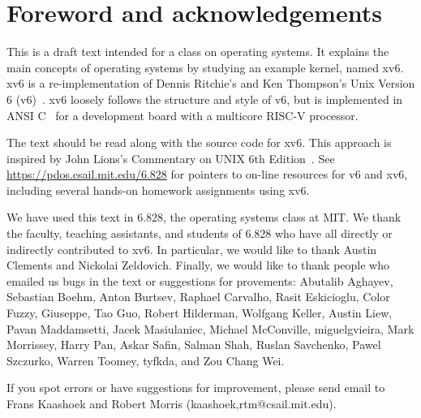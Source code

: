 \chapter*{Foreword and acknowledgements}


This is a draft text intended for a class on operating systems. It
explains the main concepts of operating systems by studying an example
kernel, named xv6.  xv6 is a re-implementation of Dennis Ritchie's and
Ken Thompson's Unix Version 6 (v6)~\cite{unix}.  xv6 loosely follows the structure
and style of v6, but is implemented in ANSI C~\cite{kernighan} for a development board
with a multicore RISC-V processor.

The text should be read along with the source code for xv6. This approach is
inspired by John Lions's Commentary on UNIX 6th Edition~\cite{lions}. See
\url{https://pdos.csail.mit.edu/6.828} for pointers to on-line
resources for v6 and xv6, including several hands-on homework assignments
using xv6.

We have used this text in 6.828, the operating systems class at MIT.  We thank
the faculty, teaching assistants, and students of 6.828 who have all directly or
indirectly contributed to xv6.  In particular, we would like to thank Austin
Clements and Nickolai Zeldovich.  Finally, we would like to thank people who
emailed us bugs in the text or suggestions for provements: Abutalib Aghayev,
Sebastian Boehm, Anton Burtsev, Raphael Carvalho, Rasit Eskicioglu, Color Fuzzy,
Giuseppe, Tao Guo, Robert Hilderman, Wolfgang Keller, Austin Liew, Pavan
Maddamsetti, Jacek Masiulaniec, Michael McConville, miguelgvieira, Mark
Morrissey, Harry Pan, Askar Safin, Salman Shah, Ruslan Savchenko, Pawel
Szczurko, Warren Toomey, tyfkda, and Zou Chang Wei.

If you spot errors or have suggestions for improvement, please send email to
Frans Kaashoek and Robert Morris (kaashoek,rtm@csail.mit.edu).
